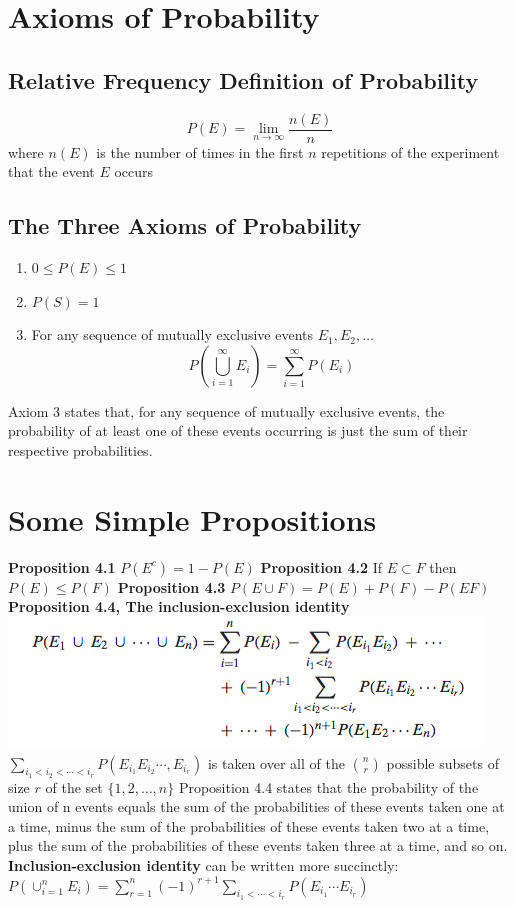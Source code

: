\documentclass[openany]{book}
\numberwithin{equation}{section}
\begin{document}
\begin{flushleft}
\section{Axioms of Probability}
\subsection{Relative Frequency Definition of Probability}
\[ P(E) = \lim_{n\to \infty} \frac{n(E)}{n}
\]
where $n(E)$ is the number of times in the first $n$ repetitions of the experiment that the event $E$ occurs \medbreak
\subsection{The Three Axioms of Probability}
\begin{enumerate}
\item $0 \leq P(E) \leq 1$
\item $P(S)=1$
\item For any sequence of mutually exclusive events $E_1,E_2,\dots$
\[ P\left(\bigcup_{i=1}^\infty E_i\right) = \sum_{i=1}^{\infty}P(E_i)
\]
\end{enumerate}
Axiom 3 states that, for any sequence of mutually exclusive events, the probability of at least one of these events occurring is just the sum of their respective probabilities.
\section{Some Simple Propositions}
\textbf{Proposition 4.1} $P(E^c)= 1-P(E)$ \medbreak
\textbf{Proposition 4.2} If $E \subset F$ then $P(E) \leq P(F)$ \medbreak
\textbf{Proposition 4.3} $P(E \cup F)= P(E) + P(F) - P(EF)$ \medbreak
\textbf{Proposition 4.4, The inclusion-exclusion identity} \includegraphics[scale=.6]{prop4.png}
$\sum\limits_{i_1<i_2<\cdots<i_r} P(E_{i_1}E_{i_2}\cdots,E_{i_r})$ is taken over all of the $n \choose r$ possible subsets of size $r$ of the set $\{1,2,\dots,n\}$ \medbreak
Proposition 4.4 states that the probability of the union of n events equals the sum of the probabilities of these events taken one at a time, minus the sum of the probabilities of these events taken two at a time, plus the sum of the probabilities of these events taken three at a time, and so on. \medbreak
\textbf{Inclusion-exclusion identity} can be written more succinctly: \\
$P(\cup_{i=1}^n E_i) = \sum \limits_{r=1}^{n}(-1)^{r+1} \sum \limits_{i_1<\cdots<i_r} P(E_{i_1}\cdots E_{i_r})$ 

\end{flushleft}
\end{document}
